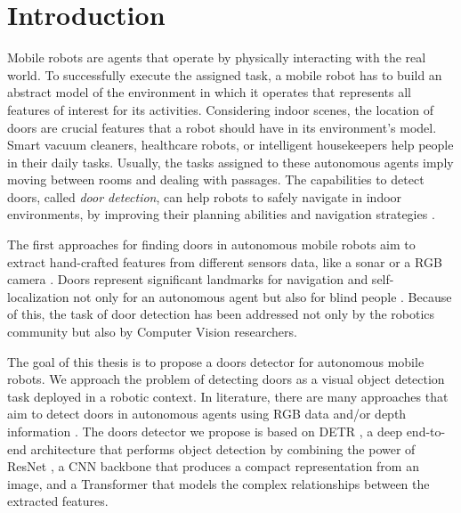 
\hypertarget{Introduzione}{%
	\chapter{Introduction}\label{header-n3}}

Mobile robots are agents that operate by physically interacting with the real world. To successfully execute the assigned task, a mobile robot has to build an abstract model of the environment in which it operates that represents all features of interest for its activities. Considering indoor scenes, the location of doors are crucial features that a robot should have in its environment's model.  Smart vacuum cleaners, healthcare robots, or intelligent housekeepers help people in their daily tasks. Usually, the tasks assigned to these autonomous agents imply moving between rooms and dealing with passages. The capabilities to detect doors, called \emph{door detection}, can help robots to safely navigate in indoor environments, by improving their planning abilities and navigation strategies \cite{sonarandivisualdoordetection, doorsandnavigation, humanoid}. 

The first approaches for finding doors in autonomous mobile robots aim to extract hand-crafted features from different sensors data, like a sonar \cite{sonarandivisualdoordetection} or a RGB camera \cite{humanoid}. Doors represent significant landmarks for navigation and self-localization not only for an autonomous agent but also for blind people \cite{edgeandcornerdoorsdetector}. Because of this, the task of door detection has been addressed not only by the robotics community but also by Computer Vision researchers. 

The goal of this thesis is to propose a doors detector for autonomous mobile robots. We approach the problem of detecting doors as a visual object detection task deployed in a robotic context. In literature, there are many approaches that aim to detect doors in autonomous agents using RGB data \cite{doorsandnavigation, detectdoorsfeature} and/or depth information \cite{doorcabinet}. The doors detector we propose is based on DETR \cite{detr}, a deep end-to-end architecture that performs object detection by combining the power of ResNet \cite{resnet}, a CNN backbone that produces a compact representation from an image, and a Transformer \cite{transformer} that models the complex relationships between the extracted features.


